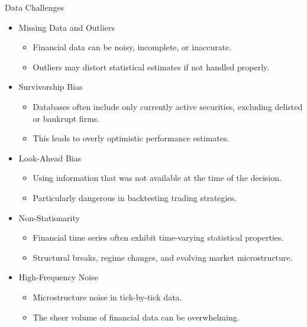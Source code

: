\documentclass[9pt, aspectratio=169, t]{beamer}
\theoremstyle{definition}
\begin{document}
\begin{frame}{Data Challenges}

\begin{itemize}
    \item Missing Data and Outliers
    \begin{itemize}
        \item Financial data can be noisy, incomplete, or inaccurate.
        \item Outliers may distort statistical estimates if not handled properly.
    \end{itemize}
    \item Survivorship Bias
    \begin{itemize}
        \item Databases often include only currently active securities, excluding delisted or bankrupt firms.
        \item This leads to overly optimistic performance estimates.
    \end{itemize}
    \item Look-Ahead Bias
    \begin{itemize}
        \item Using information that was not available at the time of the decision.
        \item Particularly dangerous in backtesting trading strategies.
    \end{itemize}
    \item Non-Stationarity
    \begin{itemize}
        \item Financial time series often exhibit time-varying statistical properties.
        \item Structural breaks, regime changes, and evolving market microstructure.
    \end{itemize}
    \item High-Frequency Noise
    \begin{itemize}
        \item Microstructure noise in tick-by-tick data.
        \item The sheer volume of financial data can be overwhelming.
    \end{itemize}
\end{itemize}

\end{frame}
\end{document}
